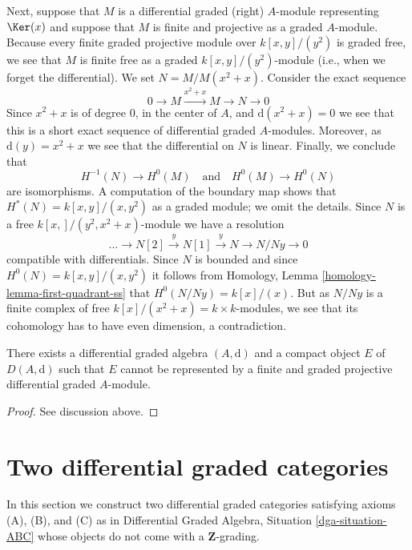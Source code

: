 \medskip\noindent
Next, suppose that $M$ is a differential graded (right) $A$-module
representing $\Ker(x)$ and suppose that $M$ is finite and
projective as a graded $A$-module. Because every finite graded projective
module over $k[x, y]/(y^2)$ is graded free, we see that $M$ is
finite free as a graded $k[x, y]/(y^2)$-module (i.e., when we forget
the differential). We set $N = M/M(x^2 + x)$.
Consider the exact sequence
$$
0 \to M \xrightarrow{x^2 + x} M \to N \to 0
$$
Since $x^2 + x$ is of degree $0$, in the center of $A$, and
$\text{d}(x^2 + x) = 0$ we see that this is a short exact sequence
of differential graded $A$-modules. Moreover, as $\text{d}(y) = x^2 + x$
we see that the differential on $N$ is linear. Finally, we conclude that
$$
H^{-1}(N) \to H^0(M)
\quad\text{and}\quad
H^0(M) \to H^0(N)
$$
are isomorphisms. A computation of the boundary map shows that
$H^*(N) = k[x, y]/(x, y^2)$ as a graded module; we omit
the details. Since $N$ is a free $k[x, ]/(y^2, x^2 + x)$-module
we have a resolution
$$
\ldots \to N[2] \xrightarrow{y} N[1] \xrightarrow{y} N \to N/Ny \to 0
$$
compatible with differentials. Since $N$ is bounded and since
$H^0(N) = k[x,y]/(x, y^2)$ it follows from
Homology, Lemma \ref{homology-lemma-first-quadrant-ss}
that $H^0(N/Ny) = k[x]/(x)$. But as $N/Ny$ is a finite complex of free
$k[x]/(x^2 + x) = k \times k$-modules, we see that its cohomology
has to have even dimension, a contradiction.

\begin{lemma}
\label{lemma-no-good-representatif-compact-object}
There exists a differential graded algebra $(A, \text{d})$ and
a compact object $E$ of $D(A, \text{d})$ such that $E$ cannot
be represented by a finite and graded projective differential
graded $A$-module.
\end{lemma}

\begin{proof}
See discussion above.
\end{proof}







\section{Two differential graded categories}
\label{section-nongraded-differential-graded}

\noindent
In this section we construct two differential graded categories satisfying
axioms (A), (B), and (C) as in
Differential Graded Algebra, Situation \ref{dga-situation-ABC}
whose objects do not come with a $\mathbf{Z}$-grading.

